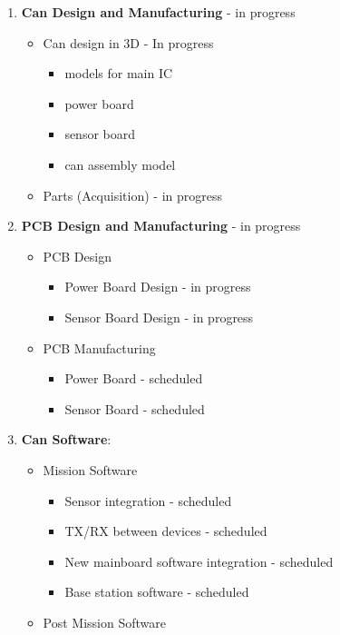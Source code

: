 \documentclass[11pt]{article}
\begin{document}
\begin{enumerate}[]
    \item \textbf{Can Design and Manufacturing} - in progress
    \begin{itemize}
    \item Can design in 3D - In progress
        \begin{itemize}
            \item models for main IC
            \item power board
            \item sensor board
            \item can assembly model
        \end{itemize}
    \item Parts (Acquisition) - in progress
    \end{itemize}    
    \item \textbf{PCB Design and Manufacturing} - in progress
    \begin{itemize}
        \item PCB Design
        \begin{itemize}
            \item Power Board Design - in progress
            \item Sensor Board Design  - in progress
        \end{itemize}
        \item PCB Manufacturing
        \begin{itemize}
            \item Power Board - scheduled
            \item Sensor Board - scheduled
        \end{itemize}    
    \end{itemize}
    \item \textbf{Can Software}:
    \begin{itemize}
        \item {Mission Software}
        \begin{itemize}
            \item Sensor integration - scheduled
            \item TX/RX between devices - scheduled
            \item New mainboard software integration - scheduled
            \item Base station software - scheduled
        \end{itemize}
        \item {Post Mission Software}

\end{itemize}
\end{enumerate}
\end{document}
